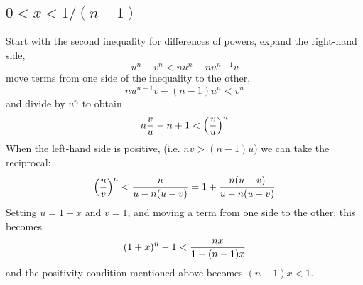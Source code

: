 \documentclass[12pt]{article}
\begin{document}
\subsection{$0 < x < 1/(n-1)$}

Start with the second inequality for differences of powers, expand 
the right-hand side,
\[ u^n - v^n < n u^n - n u^{n-1} v \]
move terms from one side of the inequality to the other,
\[ n u^{n-1} v - (n - 1) u^n < v^n \]
and divide by $u^n$ to obtain
\[ n {v \over u} - n + 1 < \left( {v \over u} \right)^n \]
When the left-hand side is positive, (i.e. $n v > (n - 1) u$)
we can take the reciprocal:
\[ \left( {u \over v} \right)^n < {u \over u - n(u - v)} = 
1 + {n (u - v) \over u  - n (u - v)} \]
Setting $u = 1 + x$ and $v = 1$, and moving a term from one side 
to the other, this becomes
\[ (1 + x)^n - 1 < { n x \over 1 - (n - 1) x} \]
and the positivity condition mentioned above becomes $(n - 1) x < 1$.
\end{document}
